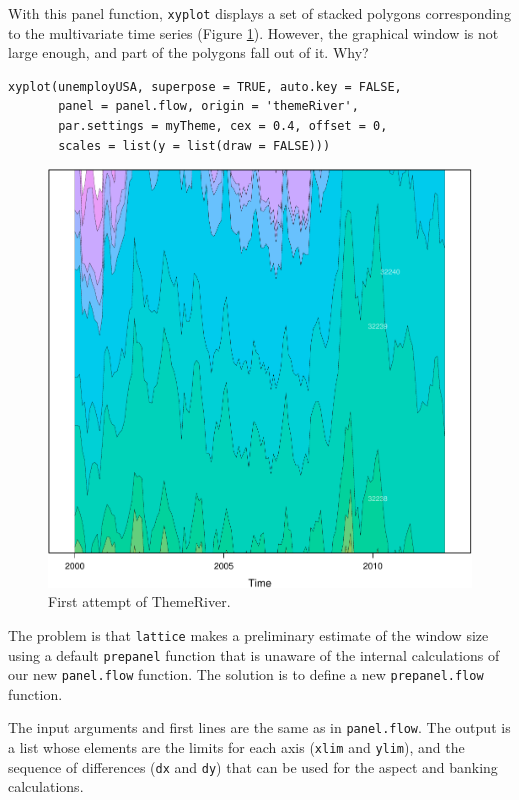 With this panel function, \texttt{xyplot} displays a set of stacked
polygons corresponding to the multivariate time series (Figure
\ref{fig:themeRiverError}). However, the graphical window is not
large enough, and part of the polygons fall out of it. Why?

\lstset{language=r,label= ,caption= ,captionpos=b,numbers=none}
\begin{lstlisting}
xyplot(unemployUSA, superpose = TRUE, auto.key = FALSE,
       panel = panel.flow, origin = 'themeRiver',
       par.settings = myTheme, cex = 0.4, offset = 0,
       scales = list(y = list(draw = FALSE)))
\end{lstlisting}

\begin{figure}[htbp]
\centering
\includegraphics[height=0.45\textheight]{figs/ThemeRiverError.pdf}
\caption{First attempt of ThemeRiver. \label{fig:themeRiverError}}
\end{figure}

The problem is that \texttt{lattice} makes a preliminary estimate of the
window size using a default \texttt{prepanel} function that is unaware of the
internal calculations of our new \texttt{panel.flow} function. The solution
is to define a new \texttt{prepanel.flow} function. 

The input arguments and first lines are the same as in
\texttt{panel.flow}. The output is a list whose elements are the limits for
each axis (\texttt{xlim} and \texttt{ylim}), and the sequence of differences (\texttt{dx}
and \texttt{dy}) that can be used for the aspect and banking
calculations. 

